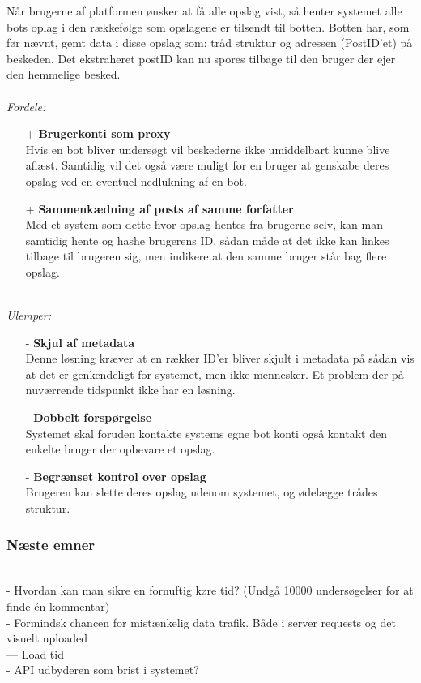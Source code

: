 Når brugerne af platformen ønsker at få alle opslag vist, så henter systemet alle bots oplag i den rækkefølge som opslagene er tilsendt til botten. Botten har, som før nævnt, gemt data i disse opslag som: tråd struktur og adressen (PostID'et) på beskeden. Det ekstraheret postID kan nu spores tilbage til den bruger der ejer den hemmelige besked.
\\\\
\textit{Fordele:}
\begin{itemize}
    \item[+] \textbf{Brugerkonti som proxy} \hfill \\ 
    Hvis en bot bliver undersøgt vil beskederne ikke umiddelbart kunne blive aflæst. Samtidig vil det også være muligt for en bruger at genskabe deres opslag ved en eventuel nedlukning af en bot.
    \item[+] \textbf{Sammenkædning af posts af samme forfatter} \hfill \\ 
    Med et system som dette hvor opslag hentes fra brugerne selv, kan man samtidig hente og hashe brugerens ID, sådan måde at det ikke kan linkes tilbage til brugeren sig, men indikere at den samme bruger står bag flere opslag.
\end{itemize}
\\
\textit{Ulemper:}
\begin{itemize}
    \item[-] \textbf{Skjul af metadata} \hfill \\
    Denne løsning kræver at en rækker ID'er bliver skjult i metadata på sådan vis at det er genkendeligt for systemet, men ikke mennesker. Et problem der på nuværrende tidspunkt ikke har en løsning.
    \item[-] \textbf{Dobbelt forspørgelse} \hfill \\
    Systemet skal foruden kontakte systems egne bot konti også kontakt den enkelte bruger der opbevare et opslag.
    \item[-] \textbf{Begrænset kontrol over opslag} \hfill \\ 
    Brugeren kan slette deres opslag udenom systemet, og ødelægge trådes struktur.
\end{itemize}



\subsubsection{Næste emner}
\\
- Hvordan kan man sikre en fornuftig køre tid? (Undgå 10000 undersøgelser for at finde én kommentar)\\
- Formindsk chancen for mistænkelig data trafik. Både i server requests og det visuelt uploaded\\
--- Load tid
\\
- API udbyderen som brist i systemet?\\

